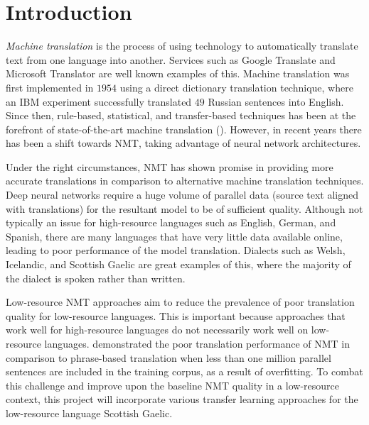 \chapter{Introduction}
\label{introduction}

\textit{Machine translation} is the process of using technology to automatically translate text from one language into another. Services such as Google Translate and Microsoft Translator are well known examples of this. 
Machine translation was first implemented in $1954$ using a direct dictionary translation technique, where an IBM experiment successfully translated $49$ Russian sentences into English.
Since then, rule-based, statistical, and transfer-based techniques has been at the forefront of state-of-the-art machine translation (\cite{chiang_phrase_2005}). However, in recent years there has been a shift towards \Gls{NMT}, taking advantage of neural network architectures.

Under the right circumstances, \acrshort{NMT} has shown promise in providing more accurate translations in comparison to alternative machine translation techniques. Deep neural networks require a huge volume of parallel data (source text aligned with translations) for the resultant model to be of sufficient quality. Although not typically an issue for high-resource languages such as English, German, and Spanish, there are many languages that have very little data available online, leading to poor performance of the model translation. Dialects such as Welsh, Icelandic, and Scottish Gaelic are great examples of this, where the majority of the dialect is spoken rather than written.

Low-resource \acrshort{NMT} approaches aim to reduce the prevalence of poor translation quality for low-resource languages.
This is important because approaches that work well for high-resource languages do not necessarily work well on low-resource languages. \cite{koehn_six_2017} demonstrated the poor translation performance of \acrshort{NMT} in comparison to phrase-based translation when less than one million parallel sentences are included in the training corpus, as a result of overfitting. To combat this challenge and improve upon the baseline \acrshort{NMT} quality in a low-resource context, this project will incorporate various transfer learning approaches for the low-resource language Scottish Gaelic.


